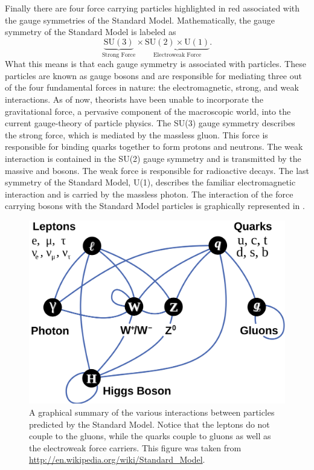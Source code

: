 Finally there are four force carrying particles highlighted in red associated
with the gauge symmetries of the Standard Model. Mathematically, the gauge 
symmetry of the Standard Model is labeled as 
\[
\underbrace{\text{SU}(3)}_{\text{Strong Force}} \times \underbrace{\text{SU}(2) \times \text{U}(1)}_{\text{Electroweak Force}}.
\]
What this means is that each gauge symmetry is associated with particles.
These particles are known as gauge bosons and are responsible for mediating three 
out of the four fundamental forces in nature: the electromagnetic, strong, and 
weak interactions. As of now, theorists have been unable to incorporate the 
gravitational force, a pervasive component of the macroscopic world,
into the current gauge-theory of particle physics.
The SU(3) gauge symmetry describes the strong force, which
is mediated by the massless gluon. This force is responsible for binding
quarks together to form protons and neutrons. The weak interaction is
contained in the SU(2) gauge symmetry and is transmitted by the massive \WBosons
and \ZBoson bosons. The weak force is responsible for radioactive decays. The
last symmetry of the Standard Model, U(1), describes the familiar electromagnetic
interaction and is carried by the massless photon. The interaction of the force
carrying bosons with the Standard Model particles is graphically represented in 
.

\begin{figure}[htbp]
    \centering
    \includegraphics[scale=0.1, angle=0]{./figures/Elementary_particle_interactions}
    \caption{A graphical summary of the various interactions between particles 
    predicted by the Standard Model. 
    Notice that the leptons do not couple to the gluons, while
    the quarks couple to gluons as well as the electroweak force carriers. 
    This figure was taken from \url{http://en.wikipedia.org/wiki/Standard_Model}.}
    \label{fig:interactions}
\end{figure}


